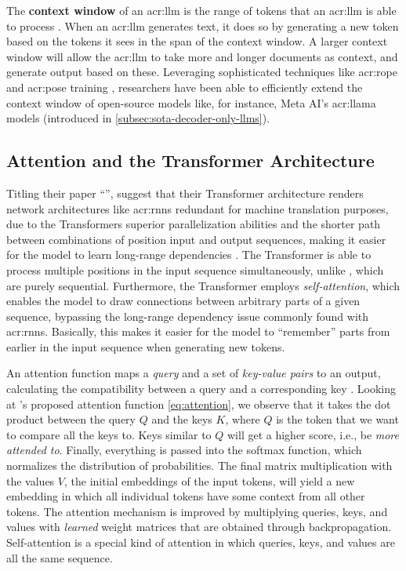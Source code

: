 The \textbf{context window} of an \acrshort{acr:llm} is the range of tokens that an \acrshort{acr:llm} is able to process \citep[1]{zhuPoSEEfficientContext2024}. When an \acrshort{acr:llm} generates text, it does so by generating a new token based on the tokens it sees in the span of the context window. A larger context window will allow the \acrshort{acr:llm} to take more and longer documents as context, and generate output based on these. Leveraging sophisticated techniques like \gls{acr:rope} \citep{suRoFormerEnhancedTransformer2024} and \gls{acr:pose} training \citep{zhuPoSEEfficientContext2024}, researchers have been able to efficiently extend the context window of open-source models like, for instance, Meta AI's \acrshort{acr:llama} models (introduced in \autoref{subsec:sota-decoder-only-llms}).


\subsection{Attention and the Transformer Architecture}
\label{subsec:attention-and-the-transformer-architecture}

Titling their paper \enquote{}, \cite{vaswaniAttentionAllYou2017} suggest that their Transformer architecture renders network architectures like \glspl{acr:rnn} redundant for machine translation purposes, due to the Transformers superior parallelization abilities and the shorter path between combinations of position input and output sequences, making it easier for the model to learn long-range dependencies \citep[6]{vaswaniAttentionAllYou2017}. The Transformer is able to process multiple positions in the input sequence simultaneously, unlike , which are purely sequential. Furthermore, the Transformer employs \textit{self-attention}, which enables the model to draw connections between arbitrary parts of a given sequence, bypassing the long-range dependency issue commonly found with \glspl{acr:rnn}. Basically, this makes it easier for the model to \enquote{remember} parts from earlier in the input sequence when generating new tokens.

An attention function maps a \textit{query} and a set of \textit{key-value pairs} to an output, calculating the compatibility between a query and a corresponding key \citep[3]{vaswaniAttentionAllYou2017}. Looking at \citeauthor{vaswaniAttentionAllYou2017}'s proposed attention function \eqref{eq:attention}, we observe that it takes the dot product between the query $Q$ and the keys $K$, where $Q$ is the token that we want to compare all the keys to. Keys similar to $Q$ will get a higher score, i.e., be \textit{more attended to}. Finally, everything is passed into the softmax function, which normalizes the distribution of probabilities. The final matrix multiplication with the values $V$, the initial embeddings of the input tokens, will yield a new embedding in which all individual tokens have some context from all other tokens. The attention mechanism is improved by multiplying queries, keys, and values with \textit{learned} weight matrices that are obtained through backpropagation. Self-attention is a special kind of attention in which queries, keys, and values are all the same sequence.

